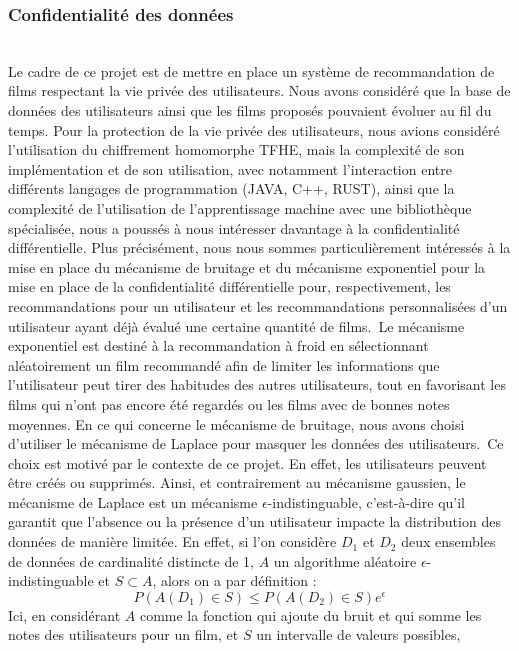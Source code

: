 \documentclass{article}
\begin{document}
\subsubsection{Confidentialité des données}
$ $\\
Le cadre de ce projet est de mettre en place un système de recommandation de films respectant la vie privée des utilisateurs. Nous avons
considéré que la base de données des utilisateurs ainsi que les films proposés pouvaient évoluer au fil du temps.
Pour la protection de la vie privée des utilisateurs, nous avions considéré l'utilisation du chiffrement homomorphe TFHE, mais
la complexité de son implémentation et de son utilisation, avec notamment l'interaction entre différents langages de programmation (JAVA, C++, RUST),
ainsi que la complexité de l'utilisation de l'apprentissage machine avec une bibliothèque spécialisée, nous a poussés à nous intéresser davantage à la confidentialité différentielle.
Plus précisément, nous nous sommes particulièrement intéressés à la mise en place du mécanisme de bruitage et du mécanisme exponentiel pour la mise
en place de la confidentialité différentielle pour, respectivement, les recommandations pour un utilisateur et les recommandations personnalisées
d'un utilisateur ayant déjà évalué une certaine quantité de films.\
Le mécanisme exponentiel est destiné à la recommandation à froid en sélectionnant aléatoirement un film recommandé afin de limiter les informations
que l'utilisateur peut tirer des habitudes des autres utilisateurs, tout en favorisant les films qui n'ont pas encore été regardés ou les films avec de bonnes notes moyennes.
En ce qui concerne le mécanisme de bruitage, nous avons choisi d'utiliser le mécanisme de Laplace pour masquer les données des utilisateurs.\
Ce choix est motivé par le contexte de ce projet. En effet, les utilisateurs peuvent être créés ou supprimés. Ainsi, et contrairement au mécanisme gaussien,
le mécanisme de Laplace est un mécanisme $\epsilon$-indistinguable, c'est-à-dire qu'il garantit que l'absence ou la présence d'un
utilisateur impacte la distribution des données de manière limitée. En effet, si l'on considère $D_1$ et $D_2$ deux ensembles de données
de cardinalité distincte de 1, $A$ un algorithme aléatoire $\epsilon$-indistinguable et $S \subset A$, alors on a par définition :
\begin{equation}
P(A(D_1) \in S) \leq P(A(D_2) \in S) e^{\epsilon}
\end{equation}
Ici, en considérant $A$ comme la fonction qui ajoute du bruit et qui somme les notes des utilisateurs pour un film, et $S$ un intervalle de valeurs possibles,
\end{document}
